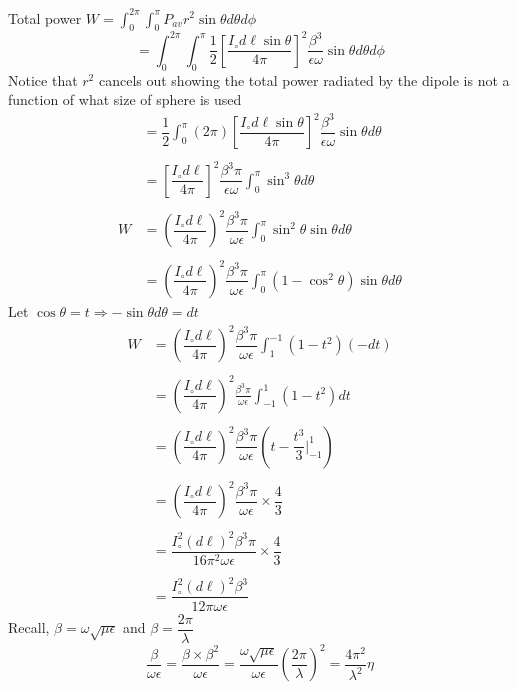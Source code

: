 Total power $ W = \int^{2\pi}_0 \int^\pi_0 P_{av}r^2\sin\theta d\theta d\phi $
$$
= \int^{2\pi}_0\int^\pi_0 \dfrac{1}{2}
\left[\dfrac{I_\circ d\ell\sin\theta}{4\pi}\right]^2\dfrac{\beta^3}{\epsilon\omega}\sin\theta d\theta d\phi
$$
Notice that $r^2$ cancels out showing the total power radiated by the dipole is not a function of what size of sphere is used
\begin{align*}
&= \dfrac{1}{2}\int^\pi_0 (2\pi) 
\left[\dfrac{I_\circ d\ell\sin\theta}{4\pi}\right]^2
\dfrac{\beta^3}{\epsilon\omega}\sin\theta d\theta\\\\
&= \left[\dfrac{I_\circ d\ell}{4\pi}\right]^2\dfrac{\beta^3\pi}{\epsilon\omega}
\int^\pi_0\sin^3\theta d\theta\\\\
W &= \left(\dfrac{I_\circ d\ell}{4\pi}\right)^2\dfrac{\beta^3\pi}{\omega\epsilon}
\int^\pi_0\sin^2\theta\sin\theta d\theta\\\\
&= \left(\dfrac{I_\circ d\ell}{4\pi}\right)^2\dfrac{\beta^3\pi}{\omega\epsilon}
\int^\pi_0\left(1 - \cos^2\theta\right)\sin\theta d\theta 
\end{align*}
Let $ \cos\theta  = t \Longrightarrow -\sin\theta d\theta = dt$
\begin{align*}
W&= \left(\dfrac{I_\circ d\ell}{4\pi}\right)^2\dfrac{\beta^3\pi}{\omega\epsilon}
\int^{-1}_1(1 - t^2)(-dt)\\\\
&= \left(\dfrac{I_\circ d\ell}{4\pi}\right)^2\frac{\beta^3\pi}{\omega\epsilon}
\int^1_{-1}(1 - t^2)dt\\\\
&= \left(\dfrac{I_\circ d\ell}{4\pi}\right)^2\dfrac{\beta^3\pi}{\omega\epsilon}
\left(t - \dfrac{t^3}{3}\bigg\vert^1_{-1}\right)\\\\
&= \left(\dfrac{I_\circ d\ell}{4\pi}\right)^2\dfrac{\beta^3\pi}{\omega\epsilon} \times \dfrac{4}{3}\\\\
&= \dfrac{I_\circ^2(d\ell)^2\beta^3\pi}{16\pi^2\omega\epsilon} \times \dfrac{4}{3}\\\\
&= \dfrac{I_\circ^2(d\ell)^2\beta^3}{12\pi\omega\epsilon}
\end{align*}
Recall, $\beta = \omega\sqrt{\mu\epsilon}$ and $\beta = \dfrac{2\pi}{\lambda}$
$$\dfrac{\beta}{\omega\epsilon} = 
\dfrac{\beta \times \beta^2}{\omega\epsilon}
 = \dfrac{\omega\sqrt{\mu\epsilon}}{\omega\epsilon}
 \left(\dfrac{2\pi}{\lambda}\right)^2
  = \dfrac{4\pi^2}{\lambda^2}\eta$$
